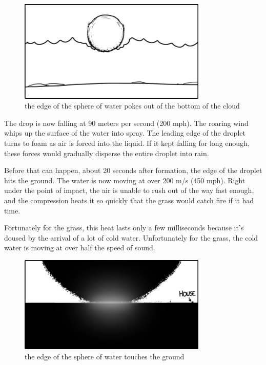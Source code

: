 \begin{figure}[!htbp]
\centering
\includegraphics[scale=0.5, max width=0.8\textwidth]{imgs/a/12/raindrop_emerges.png}
\caption{the edge of the sphere of water pokes out of the bottom of the cloud}
\end{figure}

{The drop is now falling at 90 meters per second (200 mph). The roaring wind whips up the surface of the water into spray. The leading edge of the droplet turns to foam as air is forced into the liquid. If it kept falling for long enough, these forces would gradually disperse the entire droplet into rain.}

{Before that can happen, about 20 seconds after formation, the edge of the droplet hits the ground. The water is now moving at over 200 m/s (450 mph). Right under the point of impact, the air is unable to rush out of the way fast enough, and the compression heats it so quickly that the grass would catch fire if it had time.}

{Fortunately for the grass, this heat lasts only a few milliseconds because it’s doused by the arrival of a lot of cold water. Unfortunately for the grass, the cold water is moving at over half the speed of sound.}

\begin{figure}[!htbp]
\centering
\includegraphics[scale=0.5, max width=0.8\textwidth]{imgs/a/12/raindrop_hits.png}
\caption{the edge of the sphere of water touches the ground}
\end{figure}

